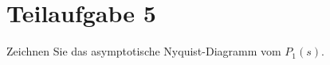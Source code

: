 \section{Teilaufgabe 5}
\begin{aufgabe}
    Zeichnen Sie das asymptotische Nyquist-Diagramm vom $P_1(s)$.
\end{aufgabe}
